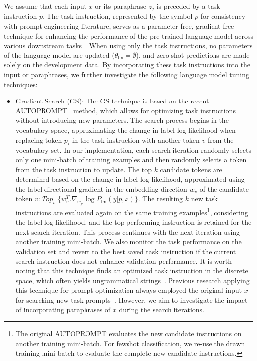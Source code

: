 \documentclass[11pt]{article}
\begin{document}
We assume that each input $x$ or its paraphrase $z_j$ is preceded by a task instruction $p$. The task instruction, represented by the symbol $p$ for consistency with prompt engineering literature, serves as a parameter-free, gradient-free technique for enhancing the performance of the pre-trained language model across various downstream tasks~\cite{DBLP:journals/corr/abs-2005-14165, petroni-etal-2019-language, deng-etal-2022-rlprompt}. When using only the task instructions, no parameters of the language model are updated ($\theta_{\text{lm}}=\emptyset$), and zero-shot predictions are made solely on the development data. By incorporating these task instructions into the input or paraphrases, we further investigate the following language model tuning techniques:
\begin{itemize}

    \item Gradient-Search (GS): The GS technique is based on the recent AUTOPROMPT~\cite{shin-etal-2020-autoprompt} method, which allows for optimizing task instructions without introducing new parameters. The search process begins in the vocabulary space, approximating the change in label log-likelihood when replacing token $p_{i}$ in the task instruction with another token $v$ from the vocabulary set. In our implementation, each search iteration randomly selects only one mini-batch of training examples and then randomly selects a token from the task instruction to update. The top $k$ candidate tokens are determined based on the change in label log-likelihood, approximated using the label directional gradient in the embedding direction $w_v$ of the candidate token $v$: $Top_v \; \{w^{T}_{v} . \nabla_{w_{p_i}} \log P_{\text{lm}}(y|p,x)\}$. The resulting $k$ new task instructions are evaluated again on the same training examples\footnote{The original AUTOPROMPT evaluates the new candidate instructions on another training mini-batch. For fewshot classification, we re-use the drawn training mini-batch to evaluate the complete new candidate instructions.}, considering the label log-likelihood, and the top-performing instruction is retained for the next search iteration. This process continues with the next iteration using another training mini-batch. We also monitor the task performance on the validation set and revert to the best saved task instruction if the current search instruction does not enhance validation performance. It is worth noting that this technique finds an optimized task instruction in the discrete space, which often yields ungrammatical strings~\cite{shin-etal-2020-autoprompt}. Previous research applying this technique for prompt optimization always employed the original input $x$ for searching new task prompts~\cite{shin-etal-2020-autoprompt, deng-etal-2022-rlprompt}. However, we aim to investigate the impact of incorporating paraphrases of $x$ during the search iterations.
    

\end{itemize}
\end{document}
